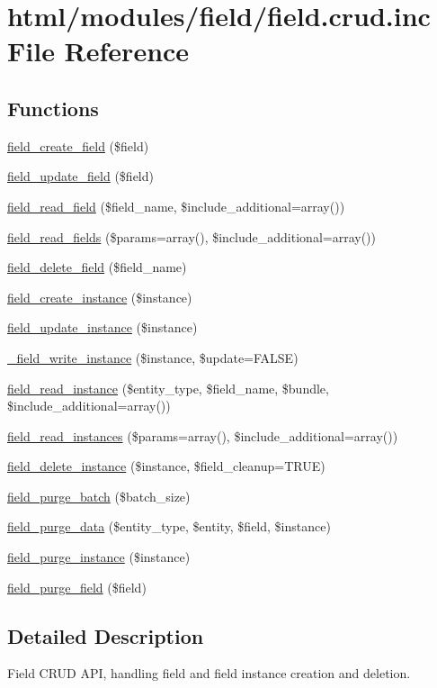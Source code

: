 \hypertarget{field_8crud_8inc}{
\section{html/modules/field/field.crud.inc File Reference}
\label{field_8crud_8inc}
}
\subsection*{Functions}
\begin{DoxyCompactItemize}
\item 
\hyperlink{group__field__crud_ga0f879889d2da2b5d638252d7eb027746}{field\_\-create\_\-field} (\$field)
\item 
\hyperlink{group__field__crud_gacca7d1f76963048aa84b1c9a271876f5}{field\_\-update\_\-field} (\$field)
\item 
\hyperlink{group__field__crud_ga65901c0b18f1d074852b3fb0ba93cabb}{field\_\-read\_\-field} (\$field\_\-name, \$include\_\-additional=array())
\item 
\hyperlink{group__field__crud_ga0dae5c311ea301668c8906d2711fb3c5}{field\_\-read\_\-fields} (\$params=array(), \$include\_\-additional=array())
\item 
\hyperlink{group__field__crud_gaa4792fd8f5f651b985dec7eca250f0f1}{field\_\-delete\_\-field} (\$field\_\-name)
\item 
\hyperlink{group__field__crud_ga3a1e23613d572a6e908e063c3a0335f8}{field\_\-create\_\-instance} (\$instance)
\item 
\hyperlink{group__field__crud_ga34a5c5247a19f6732f71aa1d67c1709d}{field\_\-update\_\-instance} (\$instance)
\item 
\hyperlink{group__field__crud_ga83dc14176ea710466ba351c1883074c9}{\_\-field\_\-write\_\-instance} (\$instance, \$update=FALSE)
\item 
\hyperlink{group__field__crud_ga7adc13c0c90428380e99dd3a0dd07737}{field\_\-read\_\-instance} (\$entity\_\-type, \$field\_\-name, \$bundle, \$include\_\-additional=array())
\item 
\hyperlink{group__field__crud_ga1d162c4a29778ee31d1d815324223ae6}{field\_\-read\_\-instances} (\$params=array(), \$include\_\-additional=array())
\item 
\hyperlink{group__field__crud_ga16bf0e2a15b20b066ff84403b5f24bf5}{field\_\-delete\_\-instance} (\$instance, \$field\_\-cleanup=TRUE)
\item 
\hyperlink{group__field__purge_gac0dcacb53338e25ac4e2add6b427757e}{field\_\-purge\_\-batch} (\$batch\_\-size)
\item 
\hyperlink{group__field__purge_ga93ec2f273b56141a5079bfaf25d6b80e}{field\_\-purge\_\-data} (\$entity\_\-type, \$entity, \$field, \$instance)
\item 
\hyperlink{group__field__purge_ga766cee439c7c920d3d406c7af41c8968}{field\_\-purge\_\-instance} (\$instance)
\item 
\hyperlink{group__field__purge_gac52122a65da997921f3a6a8f45deddbf}{field\_\-purge\_\-field} (\$field)
\end{DoxyCompactItemize}


\subsection{Detailed Description}
Field CRUD API, handling field and field instance creation and deletion. 